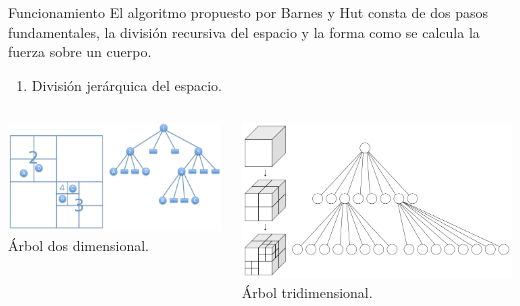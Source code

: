 \documentclass{beamer}
\newcounter{stepsBarnes}
\newcommand{\seti}{\setcounter{stepsBarnes}{\value{enumi}}}
\begin{document}
\begin{frame}{Funcionamiento}
	El algoritmo propuesto por Barnes y Hut consta de dos pasos fundamentales, la divisi\'on recursiva del espacio y la forma como se calcula la fuerza sobre un cuerpo. \pause
	\begin{enumerate}
		\item Divisi\'on jer\'arquica del espacio. \pause
		\seti
	\end{enumerate}
	\begin{columns}
		\begin{column}{0.5\linewidth}
			\centering
			\includegraphics[width=\linewidth]{sources/images/quadtree.png}\\
			\'Arbol dos dimensional.\pause
		\end{column}
		\begin{column}{0.5\linewidth}
			\centering
			\includegraphics[width=\linewidth]{sources/images/octree.png}\\
			\'Arbol tridimensional.
		\end{column}
	\end{columns}
\end{frame}
\end{document}
